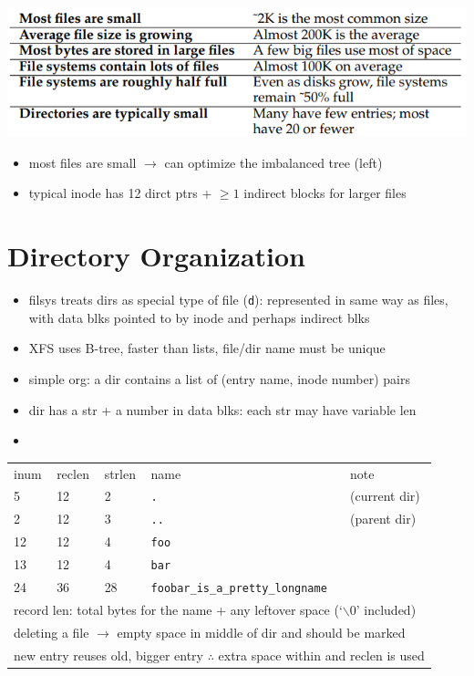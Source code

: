\includegraphics[width=\linewidth]{imgs/fs_measure_sum}
\begin{itemize}
\item most files are small $\to$ can optimize the imbalanced tree (left)
\item typical inode has 12 dirct ptrs + $\geq 1$ indirect blocks for larger files
\end{itemize}
\section*{Directory Organization}
\begin{itemize}
\item filsys treats dirs as special type of file (\texttt{d}): represented in same way as files, with data blks pointed to by inode and perhaps indirect blks
\item XFS uses B-tree, faster than lists, file/dir name must be unique
\item simple org: a dir contains a list of (entry name, inode number) pairs
\item dir has a str + a number in data blks: each str may have variable len
\item
\end{itemize}
\begin{tabular}{l|l|l|l|l}
  inum & reclen & strlen  & name        & note \\
  5    & 12     &  2      & \texttt{.}  & (current dir)\\
  2    & 12     &  3      & \texttt{..} & (parent dir)\\
  12    & 12     &  4      & \texttt{foo}&\\
  13    & 12     &  4      & \texttt{bar}&\\
  24    & 36     & 28      & \texttt{foobar\_is\_a\_pretty\_longname}&\\
  \multicolumn{5}{l}{record len: total bytes for the name + any leftover space (`$\backslash$0' included)}\\
  \hline
  \multicolumn{5}{l}{deleting a file $\to$ empty space in middle of dir and should be marked}\\
  \multicolumn{5}{l}{new entry reuses old, bigger entry $\therefore$ extra space within and reclen is used}\\
\end{tabular}
